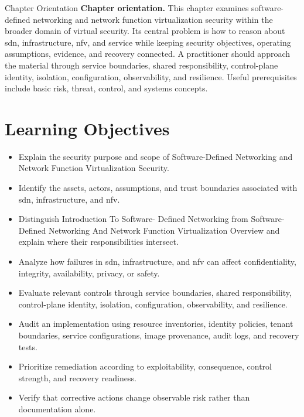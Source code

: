 \documentclass[11pt,letterpaper]{article}
\title{\CornellDocumentTitle}
\author{}
\date{}
\begin{document}
\maketitle
\begin{CornellOverviewBox}{Chapter Orientation}
\textbf{Chapter orientation.} This chapter examines software-defined networking and network function virtualization security within the broader domain of virtual security. Its central problem is how to reason about sdn, infrastructure, nfv, and service while keeping security objectives, operating assumptions, evidence, and recovery connected. A practitioner should approach the material through service boundaries, shared responsibility, control-plane identity, isolation, configuration, observability, and resilience. Useful prerequisites include basic risk, threat, control, and systems concepts.
\end{CornellOverviewBox}
\section*{Learning Objectives}
\begin{itemize}
\item Explain the security purpose and scope of Software-Defined Networking and Network Function Virtualization Security.
\item Identify the assets, actors, assumptions, and trust boundaries associated with sdn, infrastructure, and nfv.
\item Distinguish Introduction To Software- Defined Networking from Software-Defined Networking And Network Function Virtualization Overview and explain where their responsibilities intersect.
\item Analyze how failures in sdn, infrastructure, and nfv can affect confidentiality, integrity, availability, privacy, or safety.
\item Evaluate relevant controls through service boundaries, shared responsibility, control-plane identity, isolation, configuration, observability, and resilience.
\item Audit an implementation using resource inventories, identity policies, tenant boundaries, service configurations, image provenance, audit logs, and recovery tests.
\item Prioritize remediation according to exploitability, consequence, control strength, and recovery readiness.
\item Verify that corrective actions change observable risk rather than documentation alone.
\end{itemize}
\end{document}
